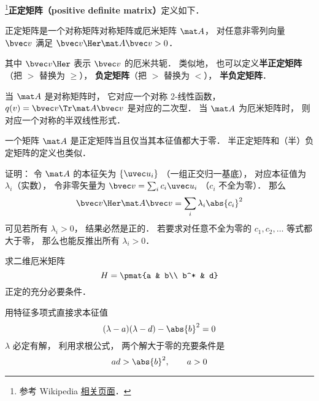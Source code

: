 
\begin{issues}
\issueTODO
\end{issues}


\footnote{参考 Wikipedia \href{https://en.wikipedia.org/wiki/Definite_matrix}{相关页面}．}\textbf{正定矩阵（positive definite matrix）}定义如下．
\begin{definition}{}
正定矩阵是一个对称矩阵对称矩阵或厄米矩阵 $\mat A$， 对任意非零列向量 $\bvec v$ 满足 $\bvec v\Her \mat A \bvec v > 0$．
\end{definition}
其中 $\bvec v\Her$ 表示 $\bvec v$ 的厄米共轭． 类似地， 也可以定义\textbf{半正定矩阵}（把 $>$ 替换为 $\geqslant$）， \textbf{负定矩阵}（把 $>$ 替换为 $<$）， \textbf{半负定矩阵}．

当 $\mat A$ 是对称矩阵时， 它对应一个对称 2-线性函数， $q(v) = \bvec v\Tr \mat A \bvec v$ 是对应的二次型． 当 $\mat A$ 为厄米矩阵时， 则对应一个对称的半双线性形式．

\begin{theorem}{}
一个矩阵 $\mat A$ 是正定矩阵当且仅当其本征值都大于零． 半正定矩阵和（半）负定矩阵的定义也类似．
\end{theorem}

证明： 令 $\mat A$ 的本征矢为 $\{\uvec u_i\}$ （一组正交归一基底）， 对应本征值为 $\lambda_i$（实数）， 令非零矢量为 $\bvec v = \sum_i c_i \uvec u_i$ （$c_i$ 不全为零）． 那么
\begin{equation}
\bvec v\Her \mat A \bvec v = \sum_i \lambda_i \abs{c_i}^2
\end{equation}
可见若所有 $\lambda_i > 0$， 结果必然是正的． 若要求对任意不全为零的 $c_1,c_2,\dots$ 等式都大于零， 那么也能反推出所有 $\lambda_i > 0$．

\begin{example}{}
求二维厄米矩阵
\begin{equation}
H = \pmat{a & b\\ b^* & d}
\end{equation}
正定的充分必要条件．

用特征多项式直接求本征值
\begin{equation}
(\lambda - a)(\lambda - d) - \abs{b}^2 = 0
\end{equation}
$\lambda$ 必定有解， 利用求根公式， 两个解大于零的充要条件是
\begin{equation}
ad > \abs{b}^2, \qquad
a > 0
\end{equation}
\end{example}

